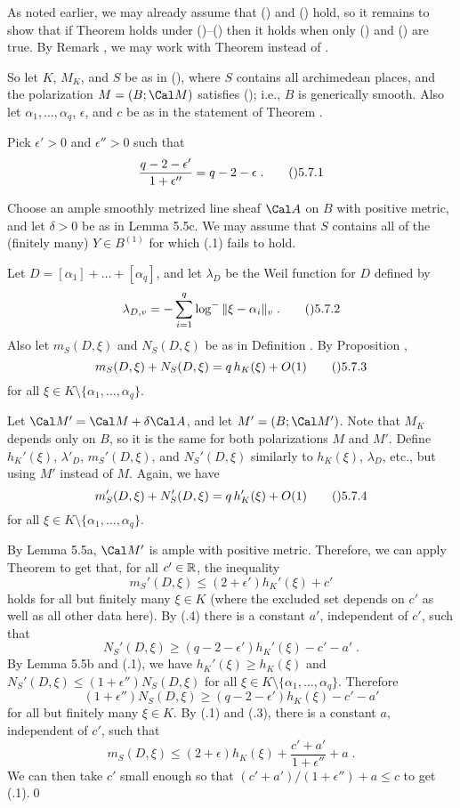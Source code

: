   As noted earlier, we may already assume that () and ()
hold, so it remains to show that if Theorem  holds under
()--() then it holds when only () and () are true.
By Remark , we may work with Theorem  instead of .

So let $K$, $M_K$, and $S$ be as in (), where $S$ contains all archimedean
places, and the polarization $M=(B;\Cal M)$ satisfies (); i.e.,
$B$ is generically smooth.  Also let $\alpha_1,\dots,\alpha_q$, $\epsilon$,
and $c$ be as in the statement of Theorem .

Pick $\epsilon'>0$ and $\epsilon''>0$ such that
$$\frac{q-2-\epsilon'}{1+\epsilon''} = q-2-\epsilon\;.\tag\05.7.1$$

Choose an ample smoothly metrized line sheaf $\Cal A$ on $B$
with positive metric, and let $\delta>0$ be as in Lemma \05.5c.
We may assume that $S$ contains all of the
(finitely many) $Y\in B^{(1)}$ for which (.1) fails to hold.

Let $D=[\alpha_1]+\dots+[\alpha_q]$, and let $\lambda_D$ be the Weil function
for $D$ defined by
$$\lambda_{D,v} = -\sum_{i=1}^q \log^{-}\|\xi-\alpha_i\|_v\;.\tag\05.7.2$$
Also let $m_S(D,\xi)$ and $N_S(D,\xi)$ be as in Definition .
By Proposition ,
$$m_S(D,\xi) + N_S(D,\xi) = q\,h_K(\xi) + O(1)\tag\05.7.3$$
for all $\xi\in K\setminus\{\alpha_1,\dots,\alpha_q\}$.

Let $\Cal M'=\Cal M+\delta\Cal A$, and let $M'=(B;\Cal M')$.
Note that $M_K$ depends only on $B$, so it is the same for both
polarizations $M$ and $M'$.  Define $h_K'(\xi)$, $\lambda'_D$, $m_S'(D,\xi)$,
and $N_S'(D,\xi)$ similarly to $h_K(\xi)$, $\lambda_D$, etc., but using $M'$
instead of $M$.  Again, we have
$$m_S'(D,\xi) + N_S'(D,\xi) = q\,h_K'(\xi) + O(1)\tag\05.7.4$$
for all $\xi\in K\setminus\{\alpha_1,\dots,\alpha_q\}$.

By Lemma \05.5a, $\Cal M'$ is ample with positive metric.  Therefore, we can
apply Theorem  to get that, for all $c'\in\Bbb R$, the inequality
$$m_S'(D,\xi) \le (2+\epsilon')h_K'(\xi) + c'$$
holds for all but finitely many $\xi\in K$ (where the excluded set
depends on $c'$ as well as all other data here).  By (.4) there is
a constant $a'$, independent of $c'$, such that
$$N_S'(D,\xi) \ge (q-2-\epsilon')h_K'(\xi) - c' - a'\;.$$
By Lemma \05.5b and (.1), we have $h_K'(\xi)\ge h_K(\xi)$
and $N_S'(D,\xi)\le(1+\epsilon'')N_S(D,\xi)$
for all $\xi\in K\setminus\{\alpha_1,\dots,\alpha_q\}$.  Therefore
$$(1+\epsilon'')N_S(D,\xi) \ge (q-2-\epsilon')h_K(\xi) - c' - a'$$
for all but finitely many $\xi\in K$.  By (.1) and (.3), there is a
constant $a$, independent of $c'$, such that
$$m_S(D,\xi) \le (2+\epsilon)h_K(\xi) + \frac{c'+a'}{1+\epsilon''} + a\;.$$
We can then take $c'$ small enough so that $(c'+a')/(1+\epsilon'')+a\le c$
to get (.1).\qed
\enddemo

